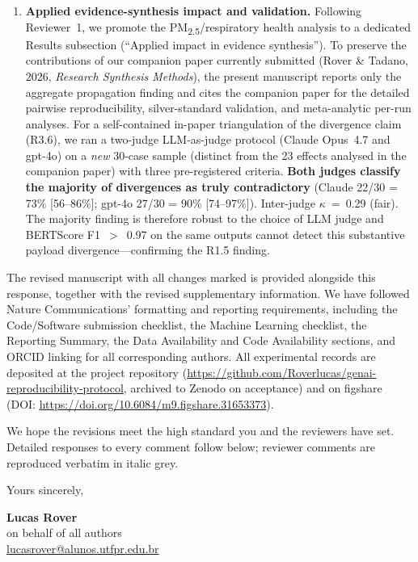 \documentclass[11pt,a4paper]{article}
\begin{document}
\begin{enumerate}[leftmargin=*]
  \item \textbf{Applied evidence-synthesis impact and validation.} Following Reviewer~1, we promote the PM\textsubscript{2.5}/respiratory health analysis to a dedicated Results subsection (``Applied impact in evidence synthesis''). To preserve the contributions of our companion paper currently submitted (Rover \& Tadano, 2026, \emph{Research Synthesis Methods}), the present manuscript reports only the aggregate propagation finding and cites the companion paper for the detailed pairwise reproducibility, silver-standard validation, and meta-analytic per-run analyses. For a self-contained in-paper triangulation of the divergence claim (R3.6), we ran a two-judge LLM-as-judge protocol (Claude Opus~4.7 and gpt-4o) on a \emph{new} 30-case sample (distinct from the 23 effects analysed in the companion paper) with three pre-registered criteria. \textbf{Both judges classify the majority of divergences as truly contradictory} (Claude 22/30 = 73\% [56--86\%]; gpt-4o 27/30 = 90\% [74--97\%]). Inter-judge $\kappa$~=~0.29 (fair). The majority finding is therefore robust to the choice of LLM judge and BERTScore F1~$>$~0.97 on the same outputs cannot detect this substantive payload divergence---confirming the R1.5 finding.
\end{enumerate}

The revised manuscript with all changes marked is provided alongside this response, together with the revised supplementary information. We have followed Nature Communications' formatting and reporting requirements, including the Code/Software submission checklist, the Machine Learning checklist, the Reporting Summary, the Data Availability and Code Availability sections, and ORCID linking for all corresponding authors. All experimental records are deposited at the project repository (\url{https://github.com/Roverlucas/genai-reproducibility-protocol}, archived to Zenodo on acceptance) and on figshare (DOI: \url{https://doi.org/10.6084/m9.figshare.31653373}).

We hope the revisions meet the high standard you and the reviewers have set. Detailed responses to every comment follow below; reviewer comments are reproduced verbatim in italic grey.

\bigskip

Yours sincerely,

\medskip

\textbf{Lucas Rover} \\
on behalf of all authors \\
\href{mailto:lucasrover@alunos.utfpr.edu.br}{lucasrover@alunos.utfpr.edu.br}
\end{document}
